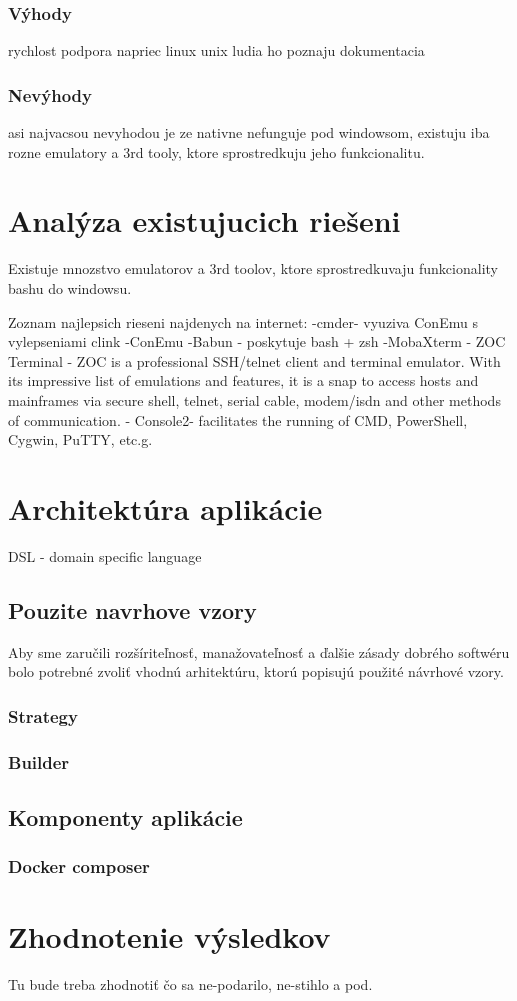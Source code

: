 \subsubsection{Výhody}
rychlost
podpora napriec linux unix 
ludia ho poznaju
dokumentacia
\subsubsection{Nevýhody}
asi najvacsou nevyhodou je ze nativne nefunguje pod windowsom, existuju iba rozne emulatory a 3rd tooly, ktore sprostredkuju jeho funkcionalitu.

\section{Analýza existujucich riešeni}
\indent
Existuje mnozstvo emulatorov a 3rd toolov, ktore sprostredkuvaju funkcionality bashu do windowsu.

Zoznam najlepsich rieseni najdenych na internet:
-cmder- vyuziva ConEmu s vylepseniami clink
-ConEmu
-Babun - poskytuje bash + zsh
-MobaXterm
- ZOC Terminal - ZOC is a professional SSH/telnet client and terminal emulator. With its impressive list of emulations and features, it is a snap to access hosts and mainframes via secure shell, telnet, serial cable, modem/isdn and other methods of communication.
- Console2-  facilitates the running of CMD, PowerShell, Cygwin, PuTTY, etc.g.


\section{Architektúra aplikácie}
DSL - domain specific language
\subsection{Pouzite navrhove vzory}
Aby sme zaručili rozšíriteľnosť, manažovateľnosť a ďalšie zásady dobrého softwéru bolo potrebné zvoliť vhodnú arhitektúru, ktorú popisujú použité návrhové vzory.
\subsubsection{Strategy}
\subsubsection{Builder}


\subsection{Komponenty aplikácie}


\subsubsection{Docker composer}


\section{Zhodnotenie výsledkov}
Tu bude treba zhodnotiť čo sa ne-podarilo, ne-stihlo a pod.